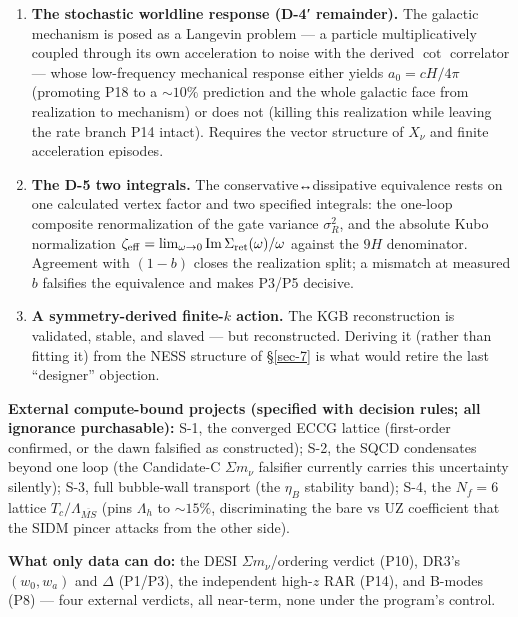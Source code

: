 \documentclass[submission, Phys]{SciPost}
\providecommand{\tightlist}{\setlength{\itemsep}{0pt}\setlength{\parskip}{0pt}}
\begin{document}
\begin{enumerate}
\def\labelenumi{\arabic{enumi}.}
\tightlist
\item
  \textbf{The stochastic worldline response (D-4′ remainder).} The
  galactic mechanism is posed as a Langevin problem --- a particle
  multiplicatively coupled through its own acceleration to noise with
  the derived \(\cot\) correlator --- whose low-frequency mechanical
  response either yields \(a_0 = cH/4\pi\) (promoting P18 to a
  \(\sim 10\%\) prediction and the whole galactic face from realization
  to mechanism) or does not (killing this realization while leaving the
  rate branch P14 intact). Requires the vector structure of \(X_\nu\)
  and finite acceleration episodes.
\item
  \textbf{The D-5 two integrals.} The conservative↔dissipative
  equivalence rests on one calculated vertex factor and two specified
  integrals: the one-loop composite renormalization of the gate variance
  \(\sigma_R^2\), and the absolute Kubo normalization
  \(\zeta_{\rm eff} = \lim_{\omega\to0}\mathrm{Im}\,\Sigma_{\rm ret}(\omega)/\omega\)
  against the \(9H\) denominator. Agreement with \((1-b)\) closes the
  realization split; a mismatch at measured \(b\) falsifies the
  equivalence and makes P3/P5 decisive.
\item
  \textbf{A symmetry-derived finite-\(k\) action.} The KGB
  reconstruction is validated, stable, and slaved --- but reconstructed.
  Deriving it (rather than fitting it) from the NESS structure of
  §\ref{sec-7} is what would retire the last ``designer'' objection.
\end{enumerate}

\textbf{External compute-bound projects (specified with decision rules;
all ignorance purchasable):} S-1, the converged ECCG lattice
(first-order confirmed, or the dawn falsified as constructed); S-2, the
SQCD condensates beyond one loop (the Candidate-C \(\Sigma m_\nu\)
falsifier currently carries this uncertainty silently); S-3, full
bubble-wall transport (the \(\eta_B\) stability band); S-4, the
\(N_f = 6\) lattice \(T_c/\Lambda_{\overline{MS}}\) (pins \(\Lambda_h\)
to \(\sim 15\%\), discriminating the bare vs UZ coefficient that the
SIDM pincer attacks from the other side).

\textbf{What only data can do:} the DESI \(\Sigma m_\nu\)/ordering
verdict (P10), DR3's \((w_0, w_a)\) and \(\Delta\) (P1/P3), the
independent high-\(z\) RAR (P14), and B-modes (P8) --- four external
verdicts, all near-term, none under the program's control.
\end{document}
